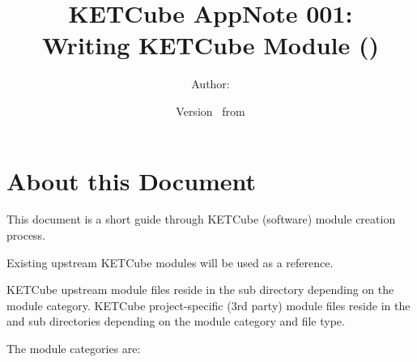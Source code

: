   




\title{\UWBLogo KETCube AppNote 001:\\ Writing KETCube Module (\vhCurrentVersion)}

\author{Author: \vhListAllAuthorsLongWithAbbrev}
\date{Version \vhCurrentVersion\ from \vhCurrentDate}

  




  


\section*{About this Document}


This document is a short guide through KETCube (software) module creation process. 

Existing upstream KETCube modules will be used as a reference.

KETCube upstream module files reside in the  sub directory depending on the module category.
KETCube project-specific (3rd party) module files reside in the  and  sub directories depending on the module category and file type.

The module categories are:

